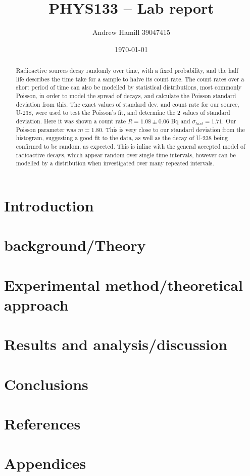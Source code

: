 \documentclass[11pt]{article}
\begin{document}
    \title{PHYS133 -- Lab report}
    \author{Andrew Hamill 39047415}
    \date{\today}
    \maketitle

    \begin{abstract}
    Radioactive sources decay randomly over time, with a fixed probability, and the half life describes the time take for a sample to halve its count rate. The count rates over a short period of time can also be modelled by statistical distributions, most commonly Poisson, in order to model the spread of decays, and calculate the Poisson standard deviation from this. The exact values of standard dev. and count rate for our source, U-238, were used to test the Poisson's fit, and determine the 2 values of standard deviation. Here it was shown a count rate $ R = 1.08 \pm 0.06$ Bq and $\sigma_{hist} = 1.71$. Our Poisson parameter was $m = 1.80$. This is very close to our standard deviation from the histogram, suggesting a good fit to the data, as well as the decay of U-238 being confirmed to be random, as expected. This is inline with the general accepted model of radioactive decays, which appear random over single time intervals, however can be modelled by a distribution when investigated over many repeated intervals. 
    \end{abstract}

    \section{Introduction}
    \section{background/Theory}
    \section{Experimental method/theoretical approach}
    \section{Results and analysis/discussion}
    \section{Conclusions}
    \section{References}
    \section{Appendices}
    
     
\end{document}
